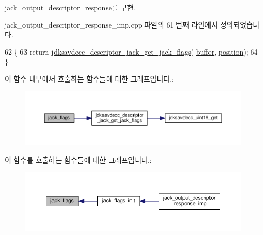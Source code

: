 \hyperlink{classavdecc__lib_1_1jack__output__descriptor__response_ac61cbd97402a059269b432ee38c188a7}{jack\+\_\+output\+\_\+descriptor\+\_\+response}를 구현.



jack\+\_\+output\+\_\+descriptor\+\_\+response\+\_\+imp.\+cpp 파일의 61 번째 라인에서 정의되었습니다.


\begin{DoxyCode}
62 \{
63     \textcolor{keywordflow}{return} \hyperlink{group__descriptor__jack_gad47529461dd0b81cd2d7273c8cc2c024}{jdksavdecc\_descriptor\_jack\_get\_jack\_flags}(
      \hyperlink{classavdecc__lib_1_1descriptor__response__base__imp_a56ed84df35de10bdb65e72b184309497}{buffer}, \hyperlink{classavdecc__lib_1_1descriptor__response__base__imp_a7a04afe5347934be732ec70a70bd0a28}{position});
64 \}
\end{DoxyCode}


이 함수 내부에서 호출하는 함수들에 대한 그래프입니다.\+:
\nopagebreak
\begin{figure}[H]
\begin{center}
\leavevmode
\includegraphics[width=350pt]{classavdecc__lib_1_1jack__output__descriptor__response__imp_a948ec24f1eab1560f4b8d7a3cc284437_cgraph}
\end{center}
\end{figure}




이 함수를 호출하는 함수들에 대한 그래프입니다.\+:
\nopagebreak
\begin{figure}[H]
\begin{center}
\leavevmode
\includegraphics[width=350pt]{classavdecc__lib_1_1jack__output__descriptor__response__imp_a948ec24f1eab1560f4b8d7a3cc284437_icgraph}
\end{center}
\end{figure}


